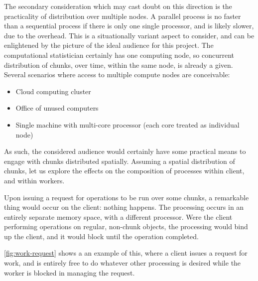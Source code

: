 The secondary consideration which may cast doubt on this direction is the practicality of distribution over multiple nodes.
A parallel process is no faster than a sequential process if there is only one single processor, and is likely slower, due to the overhead.
This is a situationally variant aspect to consider, and can be enlightened by the picture of the ideal audience for this project.
The computational statistician certainly has one computing node, so concurrent distribution of chunks, over time, within the same node, is already a given.
Several scenarios where access to multiple compute nodes are conceivable:

\begin{itemize} \item Cloud computing cluster \item Office of unused computers \item Single machine with multi-core processor (each core treated as individual node) \end{itemize}

As such, the considered audience would certainly have some practical means to engage with chunks distributed spatially.
Assuming a spatial distribution of chunks, let us explore the effects on the composition of processes within client, and within workers.

Upon issuing a request for operations to be run over some chunks, a remarkable thing would occur on the client: nothing happens.
The processing occurs in an entirely separate memory space, with a different processor.
Were the client performing operations on regular, non-chunk objects, the processing would bind up the client, and it would block until the operation completed.

\cref{fig:work-request} shows a an example of this, where a client issues
a request for work, and is entirely free to do whatever other processing
is desired while the worker is blocked in managing the request.


